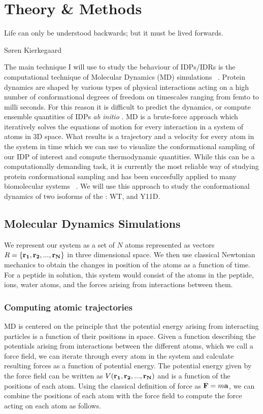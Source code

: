 \chapter{Theory \& Methods}
\epigraph{Life can only be understood backwards; but it must be lived forwards.}{S{\o}ren Kierkegaard}

The main technique I will use to study the behaviour of IDPs/IDRs is the computational technique of Molecular Dynamics (MD) simulations ~\cite{haile1992molecular}. Protein dynamics are shaped by various types of physical interactions acting on a high number of conformational degrees of freedom on timescales ranging from femto to milli seconds. For this reason it is difficult to predict the dynamics, or compute ensemble quantities of IDPs {\it ab initio} . MD is a brute-force approach which iteratively solves the equations of motion for every interaction in a system of atoms in 3D space.  What results is a trajectory and a velocity for every atom in the system in time which we can use to visualize the conformational sampling of our IDP of interest and compute thermodynamic quantities. While this can be a computationally demanding task, it is currently the most reliable way of studying protein conformational sampling \silico and has been succesfully applied to many biomolecular systems ~\cite{karplus2002molecular}. We will use this approach to study the conformational dynamics of two isoforms of the \gct: WT, and Y11D.

\section{Molecular Dynamics Simulations}

We represent our system as a set of $N$ atoms represented as  vectors $R = \{\mathbf{r_1}, \mathbf{r_2}, ... , \mathbf{r_N}\}$ in three dimensional space. We then use classical Newtonian mechanics to obtain the changes in position of the atoms as a function of time. For a peptide in solution, this system would consist of the atoms in the peptide, ions, water atoms, and the forces arising from interactions between them. 

\subsection{Computing atomic trajectories}

MD is centered on the principle that the potential energy arising from interacting particles is a function of their positions in space. Given a function describing the potentials arising from interactions between the different atoms, which we call a force field, we can iterate through every atom in the system and calculate resulting forces as a function of potential energy. The potential energy given by the force field can be written as $V(\mathbf{r_1}, \mathbf{r_2}, ..., \mathbf{r_N})$ and is a function of the positions of each atom. Using the classical definition of force as $\mathbf{F} = m\mathbf{a}$, we can combine the positions of each atom with the force field to compute the force acting on each atom as follows.  

